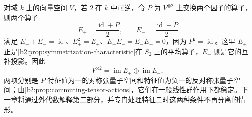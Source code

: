 \ProseParagraphBreak
对域 \(k\) 上的向量空间 \(V\)，若 \(2\) 在 \(k\) 中可逆，令 \(P\) 为 \(V^{\otimes2}\) 上交换两个因子的算子，则两个算子
\[
	E_+=\frac{\operatorname{id}+P}{2},\qquad E_-=\frac{\operatorname{id}-P}{2}
\]
满足 \(E_++E_-=\operatorname{id}\)、\(E_\pm^2=E_\pm\)、\(E_+E_-=E_-E_+=0\)，因为 \(P^2=\operatorname{id}\)。这里 \(E_+\) 正是\cref{b2:prop:symmetrization-characteristic}在 \(S_2\) 上的平均算子，\(E_-\) 则是它的互补投影。因此
\[
	V^{\otimes2}=\operatorname{im}E_+\oplus\operatorname{im}E_-,
\]
两项分别是 \(P\) 特征值为一的对称张量子空间和特征值为负一的反对称张量子空间；由\cref{b2:prop:commuting-tensor-actions}，它们在一般线性群作用下都稳定。下一章将通过外代数解释第二部分，并专门处理特征二时这两种条件不再分离的情形。
